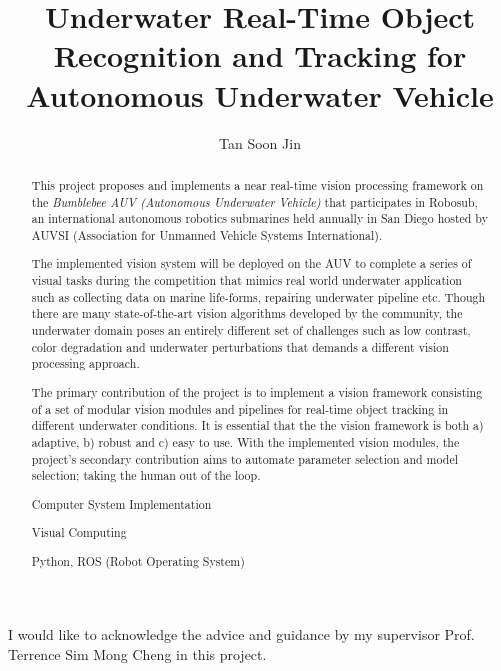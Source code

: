 \documentclass[fypca]{socreport}
\begin{document}
\title{Underwater Real-Time Object Recognition and Tracking for Autonomous Underwater Vehicle}
\author{Tan Soon Jin}

\maketitle

\begin{abstract}
This project proposes and implements a near real-time vision processing framework on the \textit{Bumblebee AUV (Autonomous Underwater Vehicle)} that participates in Robosub, an international autonomous robotics submarines held annually in San Diego hosted by AUVSI (Association for Unmanned Vehicle Systems International).

The implemented vision system will be deployed on the AUV to complete a series of visual tasks during the competition that mimics real world underwater application such as collecting data on marine life-forms, repairing underwater pipeline etc. Though there are many state-of-the-art vision algorithms developed by the community, the underwater domain poses an entirely different set of challenges such as low contrast, color degradation and underwater perturbations that demands a different vision processing approach.

The primary contribution of the project is to implement a vision framework consisting of a set of modular vision modules and pipelines for real-time object tracking in different underwater conditions. It is essential that the the vision framework is both a) adaptive, b) robust and c) easy to use. With the implemented vision modules, the project's secondary contribution aims to automate parameter selection and model selection; taking the human out of the loop.

\begin{descriptors}
    \item Computer System Implementation
    \item Visual Computing
\end{descriptors}
\begin{implement}
    Python, ROS (Robot Operating System)
\end{implement}
\end{abstract}

\begin{acknowledgement}
    I would like to acknowledge the advice and guidance by my supervisor Prof. Terrence Sim Mong Cheng in this project.
\end{acknowledgement}
\end{document}

